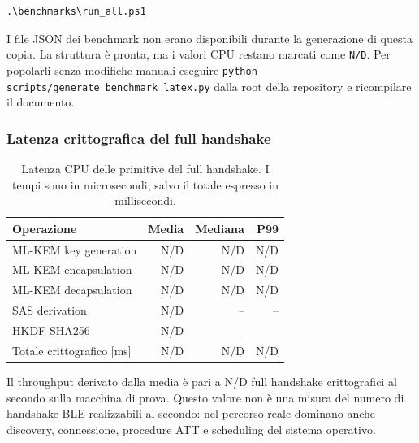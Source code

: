 \documentclass[11pt,a4paper]{article}
\newif\ifbenchmarkdata
\providecommand{\BenchGeneratedAt}{non disponibile}
\providecommand{\BenchIterations}{N/D}
\providecommand{\BenchKeygenMean}{N/D}
\providecommand{\BenchKeygenMedian}{N/D}
\providecommand{\BenchKeygenPnn}{N/D}
\providecommand{\BenchEncapsMean}{N/D}
\providecommand{\BenchEncapsMedian}{N/D}
\providecommand{\BenchEncapsPnn}{N/D}
\providecommand{\BenchDecapsMean}{N/D}
\providecommand{\BenchDecapsMedian}{N/D}
\providecommand{\BenchDecapsPnn}{N/D}
\providecommand{\BenchSasMean}{N/D}
\providecommand{\BenchHkdfMean}{N/D}
\providecommand{\BenchTotalMeanMs}{N/D}
\providecommand{\BenchTotalMedianMs}{N/D}
\providecommand{\BenchTotalPnnMs}{N/D}
\providecommand{\BenchHandshakeRate}{N/D}
\begin{document}
\begin{lstlisting}[style=bashstyle]
.\benchmarks\run_all.ps1
\end{lstlisting}

\ifbenchmarkdata
I valori seguenti provengono dagli artefatti JSON reali generati il
\BenchGeneratedAt. Il benchmark crittografico ha utilizzato
\BenchIterations{} iterazioni misurate, escludendo warm-up, scan,
connessione e trasferimento GATT.
\else
\begin{importantbox}
I file JSON dei benchmark non erano disponibili durante la generazione di
questa copia. La struttura è pronta, ma i valori CPU restano marcati come
\texttt{N/D}. Per popolarli senza modifiche manuali eseguire
\texttt{python scripts/generate\_benchmark\_latex.py} dalla root della
repository e ricompilare il documento.
\end{importantbox}
\fi

\subsubsection{Latenza crittografica del full handshake}

\begin{table}[H]
\centering
\caption{Latenza CPU delle primitive del full handshake. I tempi sono in microsecondi, salvo il totale espresso in millisecondi.}
\label{tab:benchmark-handshake}
\begin{tabular}{lrrr}
\toprule
Operazione & Media & Mediana & P99 \\
\midrule
ML-KEM key generation & \BenchKeygenMean & \BenchKeygenMedian & \BenchKeygenPnn \\
ML-KEM encapsulation & \BenchEncapsMean & \BenchEncapsMedian & \BenchEncapsPnn \\
ML-KEM decapsulation & \BenchDecapsMean & \BenchDecapsMedian & \BenchDecapsPnn \\
SAS derivation & \BenchSasMean & -- & -- \\
HKDF-SHA256 & \BenchHkdfMean & -- & -- \\
\midrule
Totale crittografico [ms] & \BenchTotalMeanMs & \BenchTotalMedianMs & \BenchTotalPnnMs \\
\bottomrule
\end{tabular}
\end{table}

Il throughput derivato dalla media è pari a
\BenchHandshakeRate{} full handshake crittografici al secondo sulla
macchina di prova. Questo valore non è una misura del numero di handshake
BLE realizzabili al secondo: nel percorso reale dominano anche discovery,
connessione, procedure ATT e scheduling del sistema operativo.
\end{document}
